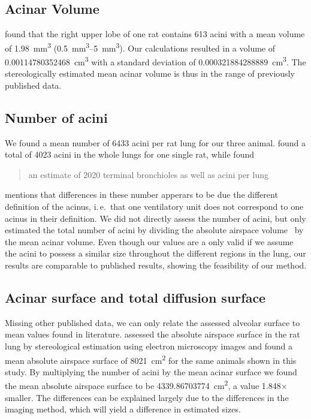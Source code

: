 \documentclass[paper=a4,abstract=true,english,DIV=calc]{scrartcl}
\newcommand{\ie}{i.\,e.\ }
\newcommand{\meantotalnumberofacini}{6433}
\newcommand{\meanacinarvolume}{0.00114780352468} %
\newcommand{\std}{0.000321884288889} %
\newcommand{\meanairspacesurface}{4339.86703774} %
\newcommand{\airspacedifference}{1.848} %
\begin{document}
\subsection{Acinar Volume}
\citet[Table 1]{Rodriguez1987} found that the right upper lobe of one rat contains 613 acini with a mean volume of \SI{1.98}{\milli\meter\cubed} (\SIrange{0.5}{5}{\milli\meter\cubed}).
Our calculations resulted in a volume of \SI{\meanacinarvolume}{\cubic\centi\meter} with a standard deviation of \SI{\std}{\cubic\centi\meter}.
The stereologically estimated mean acinar volume is thus in the range of previously published data.

\subsection{Number of acini}
We found a mean number of \meantotalnumberofacini\xspace acini per rat lung for our three animal.
\citet[page 146]{Rodriguez1987} found a total of 4023 acini in the whole lungs for one single rat, while \citet{Mercer1987a} found \blockquote{an estimate of 2020 terminal bronchioles as well as acini per lung}.
\citet{Mercer1987a} mentions that differences in these number apperars to be due the different definition of the acinus, \ie that one ventilatory unit does not correspond to one acinus in their definition.
We did not directly assess the number of acini, but only estimated the total number of acini by dividing the absolute airspace volume~\cite{Tschanz2003} by the mean acinar volume.
Even though our values are a only valid if we assume the acini to possess a similar size throughout the different regions in the lung, our results are comparable to published results, showing the feasibility of our method.

\subsection{Acinar surface and total diffusion surface}
Missing other published data, we can only relate the assessed alveolar surface to mean values found in literature.
\citet{Tschanz2003} assessed the absolute airspace surface in the rat lung by stereological estimation using electron microscopy images and found a mean absolute airspace surface of \SI{8021}{\centi\metre\squared} for the same animals shown in this study.
By multiplying the number of acini by the mean acinar surface we found the mean absolute airspace surface to be \SI{\meanairspacesurface}{\centi\metre\squared}, a value \airspacedifference\(\times\) smaller.
The differences can be explained largely due to the differences in the imaging method, which will yield a difference in estimated sizes.
\end{document}
